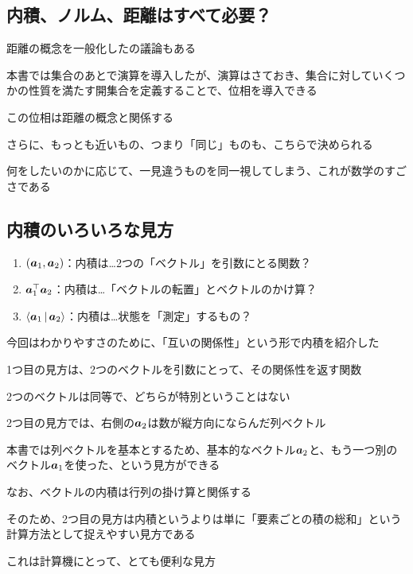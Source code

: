 \documentclass[../book_half_step_linear]{subfiles}
\begin{document}
\sectionline
\subsection{内積、ノルム、距離はすべて必要？}

距離の概念を一般化したの議論もある

本書では集合のあとで演算を導入したが、演算はさておき、集合に対していくつかの性質を満たす開集合を定義することで、位相を導入できる

この位相は距離の概念と関係する

さらに、もっとも近いもの、つまり「同じ」ものも、こちらで決められる

\br

何をしたいのかに応じて、一見違うものを同一視してしまう、これが数学のすごさである

\sectionline
\subsection{内積のいろいろな見方}

\begin{enumerate}
  \item $(\vb*{a}_1,\vb*{a}_2)$：内積は…2つの「ベクトル」を引数にとる関数？
  \item $\vb*{a}_1^\top \vb*{a}_2$：内積は…「ベクトルの転置」とベクトルのかけ算？
  \item $\Braket{\vb*{a}_1|\vb*{a}_2}$：内積は…状態を「測定」するもの？
\end{enumerate}

今回はわかりやすさのために、「互いの関係性」という形で内積を紹介した

1つ目の見方は、2つのベクトルを引数にとって、その関係性を返す関数

2つのベクトルは同等で、どちらが特別ということはない

\br

2つ目の見方では、右側の$\vb*{a}_2$は数が縦方向にならんだ列ベクトル

本書では列ベクトルを基本とするため、基本的なベクトル$\vb*{a}_2$と、もう一つ別のベクトル$\vb*{a}_1$を使った、という見方ができる

\br

なお、ベクトルの内積は行列の掛け算と関係する

そのため、2つ目の見方は内積というよりは単に「要素ごとの積の総和」という計算方法として捉えやすい見方である

これは計算機にとって、とても便利な見方
\end{document}

